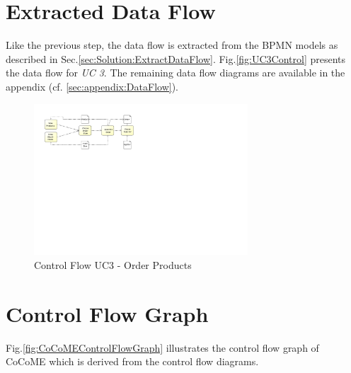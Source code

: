 \section{Extracted Data Flow}
\label{sec:SolutionApplication:ExtractControlFlow}
Like the previous step, the data flow is extracted from the BPMN models as described in Sec.\ref{sec:Solution:ExtractDataFlow}. Fig.\ref{fig:UC3Control} presents the data flow for \textit{UC 3}. The remaining data flow diagrams are available in the appendix (cf. \ref{sec:appendix:DataFlow}).

\begin{figure}[h!]
	\centering
	\includegraphics[width=8cm, trim={5cm 14cm 17cm 0cm}]{img/UC3DFD.pdf}
	\caption{Control Flow UC3 - Order Products}
	\label{fig:UC3DFD}
\end{figure}

\section{Control Flow Graph}
\label{sec:SolutionApplication:ControlFLowGraph}
Fig.\ref{fig:CoCoMEControlFlowGraph} illustrates the control flow graph of CoCoME which is derived from the control flow diagrams. 

